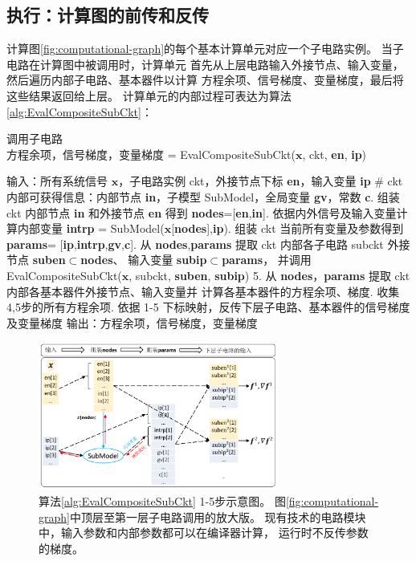 \subsection{执行：计算图的前传和反传}\label{subsec:EvalCompositeSubCkt}
计算图\ref{fig:computational-graph}的每个基本计算单元对应一个子电路实例。
当子电路在计算图中被调用时，计算单元
首先从上层电路输入外接节点、输入变量，然后遍历内部子电路、基本器件以计算
方程余项、信号梯度、变量梯度，最后将这些结果返回给上层。
计算单元的内部过程可表达为算法\ref{alg:EvalCompositeSubCkt}：\\
\begin{algorithm}[H]
  \caption{调用子电路\\
  方程余项，信号梯度，变量梯度 = EvalCompositeSubCkt($\bm{x}$, ckt, \textbf{en}, \textbf{ip})}
  \label{alg:EvalCompositeSubCkt}
  \SetAlgoLined
  输入：所有系统信号 $\bm{x}$，子电路实例 ckt，外接节点下标 \textbf{en}，输入变量 \textbf{ip}\;
  \# ckt 内部可获得信息：内部节点 \textbf{in}，子模型 SubModel，全局变量 \textbf{gv}，常数 \textbf{c}. 组装 ckt 内部节点 \textbf{in} 和外接节点 \textbf{en} 得到 \textbf{nodes}=[\textbf{en},\textbf{in}]. 依据内外信号及输入变量计算内部变量 \textbf{intrp} = 
  SubModel($\bm{x}$[\textbf{nodes}],\textbf{ip}). 组装 ckt 当前所有变量及参数得到 \textbf{params}=
  [\textbf{ip},\textbf{intrp},\textbf{gv},\textbf{c}]. 从 \textbf{nodes},\textbf{params} 提取 ckt 内部各子电路 subckt
  外接节点 \textbf{suben}$\subset$\textbf{nodes}、
  输入变量 \textbf{subip}$\subset$\textbf{params}，
  并调用 EvalCompositeSubCkt($\bm{x}$, subckt, \textbf{suben}, \textbf{subip})\;
  5. 从 \textbf{nodes}，\textbf{params} 提取 ckt 内部各基本器件外接节点、输入变量并
  计算各基本器件的方程余项、梯度. 收集4,5步的所有方程余项. 依据 1-5 下标映射，反传下层子电路、基本器件的信号梯度及变量梯度\;
  输出：方程余项，信号梯度，变量梯度
\end{algorithm}
\vspace{\parsep}
\begin{figure}[htpb]
  \centering
  \includegraphics[width=0.7\textwidth]{fig/EvalCompositeSubCkt.pdf}
  \caption{算法\ref{alg:EvalCompositeSubCkt} 1-5步示意图。
  图\ref{fig:computational-graph}中顶层至第一层子电路调用的放大版。
  现有技术的电路模块中，输入参数和内部参数都可以在编译器计算，
  运行时不反传参数的梯度。}
  \label{fig:EvalCompositeSubCkt}
\end{figure}
